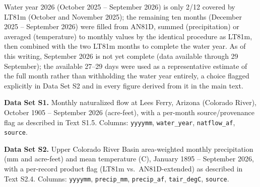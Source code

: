 \documentclass[draft,grl]{agutexSI2019}
\begin{document}
\begin{article}
Water year 2026 (October 2025 -- September 2026) is only 2/12 covered by LT81m (October and November 2025); the remaining ten months (December 2025 -- September 2026) were filled from AN81D, summed (precipitation) or averaged (temperature) to monthly values by the identical procedure as LT81m, then combined with the two LT81m months to complete the water year. As of this writing, September 2026 is not yet complete (data available through 29 September); the available 27--29 days were used as a representative estimate of the full month rather than withholding the water year entirely, a choice flagged explicitly in Data Set S2 and in every figure derived from it in the main text.


\noindent\textbf{Data Set S1.} Monthly naturalized flow at Lees Ferry, Arizona (Colorado River), October 1905 -- September 2026 (acre-feet), with a per-month source/provenance flag as described in Text S1.5. Columns: \texttt{yyyymm}, \texttt{water\_year}, \texttt{natflow\_af}, \texttt{source}.

\noindent\textbf{Data Set S2.} Upper Colorado River Basin area-weighted monthly precipitation (mm and acre-feet) and mean temperature (\textdegree C), January 1895 -- September 2026, with a per-record product flag (LT81m vs.\ AN81D-extended) as described in Text S2.4. Columns: \texttt{yyyymm}, \texttt{precip\_mm}, \texttt{precip\_af}, \texttt{tair\_degC}, \texttt{source}.






%

%
%
\end{article}
\clearpage
\end{document}
